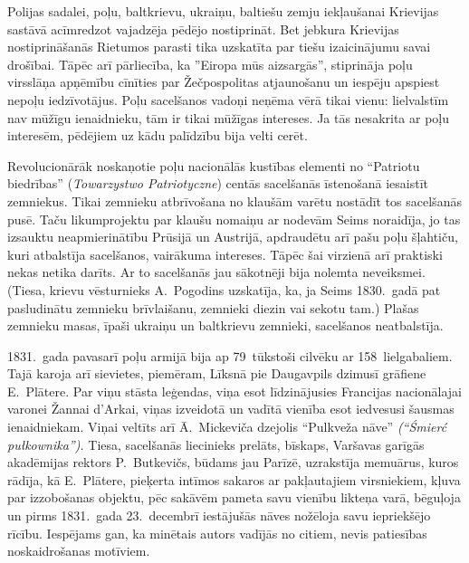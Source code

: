 \documentclass[twoside,a5paper,12pt,fleqn,openany]{extbook}
\newcommand{\pltxti}[1]{\textit{\textpolish{#1}}}
\begin{document}
Polijas sadalei, poļu, baltkrievu, ukraiņu, baltiešu zemju iekļaušanai Krievijas sastāvā acīmredzot vajadzēja pēdējo nostiprināt. Bet jebkura Krievijas nostiprināšanās Rietumos parasti tika uzskatīta par tiešu izaicinājumu savai drošībai. Tāpēc arī pārliecība, ka ''Eiropa mūs aizsargās'', stiprināja poļu virsslāņa apņēmību cīnīties par Žečpospolitas atjaunošanu un iespēju apspiest nepoļu iedzīvotājus. Poļu sacelšanos vadoņi neņēma vērā tikai vienu: lielvalstīm nav mūžīgu ienaidnieku, tām ir tikai mūžīgas intereses. Ja tās nesakrita ar poļu interesēm, pēdējiem uz kādu palīdzību bija velti cerēt.

Revolucionārāk noskaņotie poļu nacionālās kustības elementi no ``Patriotu biedrības'' (\pltxti{Towarzystwo Patriotyczne}) centās sacelšanās īstenošanā iesaistīt zemniekus. Tikai zemnieku atbrīvošana no klaušām varētu nostādīt tos sacelšanās pusē. Taču likumprojektu par klaušu nomaiņu ar nodevām Seims noraidīja, jo tas izsauktu neapmierinātību Prūsijā un Austrijā, apdraudētu arī pašu poļu šļahtiču, kuri atbalstīja sacelšanos, vairākuma intereses. Tāpēc šai virzienā arī praktiski nekas netika darīts. Ar to sacelšanās jau sākotnēji bija nolemta neveiksmei. (Tiesa, krievu vēsturnieks A.~Pogodins uzskatīja, ka, ja Seims 1830.~gadā pat pasludinātu zemnieku brīvlaišanu, zemnieki diezin vai sekotu tam.) Plašas zemnieku masas, īpaši ukraiņu un baltkrievu zemnieki, sacelšanos neatbalstīja.

1831.~gada pavasarī poļu armijā bija ap 79~tūkstoši cilvēku ar 158~lielgabaliem. Tajā karoja arī sievietes, piemēram, Līksnā pie Daugavpils dzimusī grāfiene E.~Plātere. Par viņu stāsta leģendas, viņa esot līdzinājusies Francijas nacionālajai varonei Žannai d’Arkai, viņas izveidotā un vadītā vienība esot iedvesusi šausmas ienaidniekam. Viņai veltīts arī Ā.~Mickeviča dzejolis ``Pulkveža nāve'' \pltxti{(``Śmierć pułkownika'').} Tiesa, sacelšanās liecinieks prelāts, bīskaps, Varšavas garīgās akadēmijas rektors P.~Butkevičs, būdams jau Parīzē, uzrakstīja memuārus, kuros rādīja, kā E.~Plātere, pieķerta intīmos sakaros ar pakļautajiem virsniekiem, kļuva par izzobošanas objektu, pēc sakāvēm pameta savu vienību likteņa varā, bēguļoja un pirms 1831.~gada 23.~decembrī iestājušās nāves nožēloja savu iepriekšējo rīcību. Iespējams gan, ka minētais autors vadījās no citiem, nevis patiesības noskaidrošanas motīviem.
\end{document}

